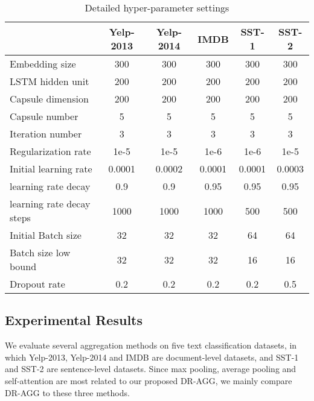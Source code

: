 \documentclass[11pt]{article}
\begin{document}
\begin{table}[t!] \setlength{\tabcolsep}{3pt}
  \centering \begin{tabular}{lccccc}
    \toprule
  &\textbf{Yelp-2013} &\textbf{Yelp-2014} & \textbf{IMDB} &\textbf{SST-1} & \textbf{SST-2}\\
\midrule Embedding size           		&300    	&300       	&300  		&300     &300     \\
LSTM hidden unit         		&200		&200       	&200    	&200     &200     \\
Capsule dimension	        	&200		&200       	&200    	&200     &200     \\
Capsule number	         		&5			&5       	&5    		&5     	 &5     \\
Iteration number	         	&3			&3       	&3    		&3     	 &3     \\
Regularization rate        		&1e-5      	&1e-5
&1e-6   	&1e-6    &1e-5    \\
Initial learning rate         	&0.0001     &0.0002     &0.0001   	&0.0001  &0.0003  \\
learning rate decay        		&0.9      	&0.9      	&0.95   	&0.95    &0.95    \\
learning rate decay steps       &1000      	&1000     	&1000   	&500     &500  \\
Initial Batch size         		&32      	&32     	&32   		&64      &64   \\
Batch size low bound         	&32      	&32     	&32   		&16      &16   \\
Dropout rate         			&0.2      	&0.2      	&0.2   		&0.2     &0.5  \\

    \bottomrule
  \end{tabular}
  \caption{Detailed hyper-parameter settings}
  \label{tab:hypersetting}
\end{table}

\subsection{Experimental Results}
We evaluate several aggregation methods  on five text classification datasets, in which Yelp-2013, Yelp-2014 and IMDB are document-level datasets, and SST-1 and SST-2 are sentence-level datasets. Since max pooling, average pooling and self-attention are most related to our proposed DR-AGG, we mainly compare DR-AGG to these three methods. 
\end{document}
